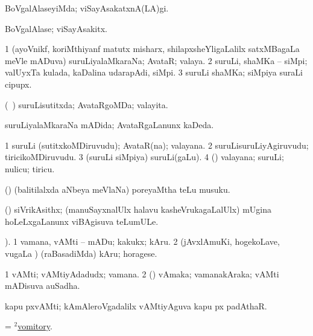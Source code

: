 \bentry 
{} 
\gl{\kirxvi}
\expl{}
\bmng
 BoVgalAlaseyiMda; viSayAsakatxnA(LA)gi. 
\emng
\eentry

\bentry 
{} 
\gl{\nA}
\expl{}
\bmng
 BoVgalAlase; viSayAsakitx. 
\emng
\eentry

\bentry
{} 
\gl{\nA}
\expl{}
\bmng
\bnum
\num{1} (ayoVnikf, koriMthiyanf matutx misharx, shilapxsheYligaLalilx satxMBagaLa meVle mADuva) suruLiyalaMkaraNa; AvataR; valaya. 
\num{2} suruLi, shaMKa -- siMpi; valUyxTa kulada, kaDalina udarapAdi, siMpi. 
\num{3} suruLi shaMKa; siMpiya suraLi cipupx. 
\enum
\emng
\eentry

\bentry
{} 
\gl{\gu}
\expl{}
\bmng
 (\kanmu\ \savi) suruLisutitxda; AvataRgoMDa; valayita. 
\emng
\eentry

\bentry 
{} 
\gl{\gu}
\expl{}
\bmng
suruLiyalaMkaraNa mADida; AvataRgaLanunx kaDeda. 
\emng
\eentry

\bentry 
{} 
\gl{\nA}
\expl{}
\bmng
\bnum
\num{1} suruLi (sutitxkoMDiruvudu); AvataR(na); valayana. 
\num{2} suruLisuruLiyAgiruvudu; tiricikoMDiruvudu. 
\num{3} (suruLi siMpiya) suruLi(gaLu). 
\num{4} (\aMrashA) valayana; suruLi; nulicu; tiricu. 
\enum
\emng
\eentry

\bentry 
{} 
\gl{\nA}
\expl{}
\bmng
 (\savi) (balitilalxda aNbeya meVlaNa) poreyaMtha teLu musuku. 
\emng
\eentry

\bentry 
{} 
\gl{\nA}
\expl{}
\bmng
 (\aMrashA) siVrikAsithx; (manuSayxnalUlx halavu kasheVrukagaLalUlx) mUgina hoLeLxgaLanunx viBAgisuva teLumULe. 
\emng
\eentry

\bentry
{} 
\gl{\sakirx}
). \bmng
\bnum
\num{1} vamana, vAMti -- mADu; kakukx; kAru. 
\num{2} (jAvxlAmuKi, hogekoLave, \mo vugaLa \vi) (raBasadiMda) kAru; horagese. 
\enum
\emng
\eentry

\bentry 
{} 
\gl{\nA}
\expl{}
\bmng
\bnum
\num{1} vAMti; vAMtiyAdadudx; vamana. 
\num{2} (\pArxparx) vAmaka; vamanakAraka; vAMti mADisuva auSadha. 
\enum
\emng

\noindent 
\gl{\pagu}
\expl{}
\bmng
  kapu pxvAMti; kAmAleroVgadalilx vAMtiyAguva kapu px padAthaR. 
\emng
\eentry

\bentry
{} 
\gl{\nA}
\bmng
 = \hyperlink{vomitory(2)}{$^2$vomitory}. 
\emng
\eentry

